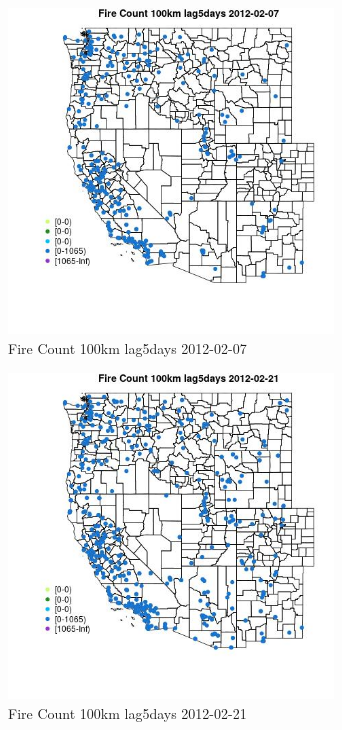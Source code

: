 \begin{figure} 
\centering  
\includegraphics[width=0.77\textwidth]{Code_Outputs/Report_ML_input_PM25_Step4_part_f_de_duplicated_aves_prioritize_24hr_obswNAs_MapObsFire_Count_100km_lag5days2012-02-07.jpg} 
\caption{\label{fig:Report_ML_input_PM25_Step4_part_f_de_duplicated_aves_prioritize_24hr_obswNAsMapObsFire_Count_100km_lag5days2012-02-07}Fire Count 100km lag5days 2012-02-07} 
\end{figure} 
 

\clearpage 

\begin{figure} 
\centering  
\includegraphics[width=0.77\textwidth]{Code_Outputs/Report_ML_input_PM25_Step4_part_f_de_duplicated_aves_prioritize_24hr_obswNAs_MapObsFire_Count_100km_lag5days2012-02-21.jpg} 
\caption{\label{fig:Report_ML_input_PM25_Step4_part_f_de_duplicated_aves_prioritize_24hr_obswNAsMapObsFire_Count_100km_lag5days2012-02-21}Fire Count 100km lag5days 2012-02-21} 
\end{figure} 
 

